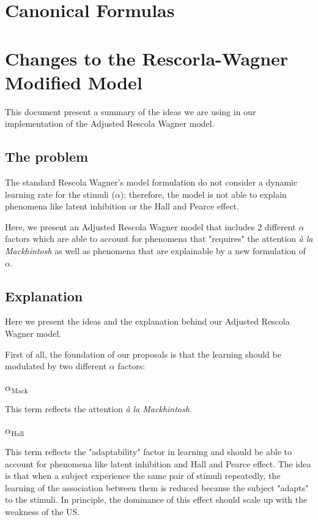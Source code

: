 \documentclass[11pt,a4paper]{article}
\newcommand{\alphamack}{\alpha _{\text{Mack}}}
\newcommand{\alphahall}{\alpha _{\text{Hall}}}
\begin{document}
\section*{Canonical Formulas}

\clearpage{}

\section*{Changes to the Rescorla-Wagner Modified Model}
This document present a summary of the ideas we are using in our implementation of the Adjusted Rescola Wagner model.

\subsection{The problem}
The standard Rescola Wagner's model formulation do not consider a dynamic learning rate for the stimuli ($\alpha$); therefore, the model is not able to explain phenomena like latent inhibition or the Hall and Pearce effect.

Here, we present an Adjusted Rescola Wagner model that includes 2 different $\alpha$ factors which are able to account for phenomena that "requires" the attention \textit{à la Mackhintosh} as well as phenomena that are explainable by a new formulation of $\alpha$.

\subsection{Explanation}
Here we present the ideas and the explanation behind our Adjusted Rescola Wagner model. 

First of all, the foundation of our proposals is that the learning should be modulated by two different $\alpha$ factors:

\subsubsection{$\alphamack$}
This term reflects the attention \textit{à la Mackhintosh}.

\subsubsection{$\alphahall$}
This term reflects the "adaptability" factor in learning and should be able to account for phenomena like latent inhibition and Hall and Pearce effect. The idea is that when a subject experience the same pair of stimuli repeatedly, the learning of the association between them is reduced because the subject "adapts" to the stimuli. In principle, the dominance of this effect should scale up with the weakness of the US.  
\end{document}
